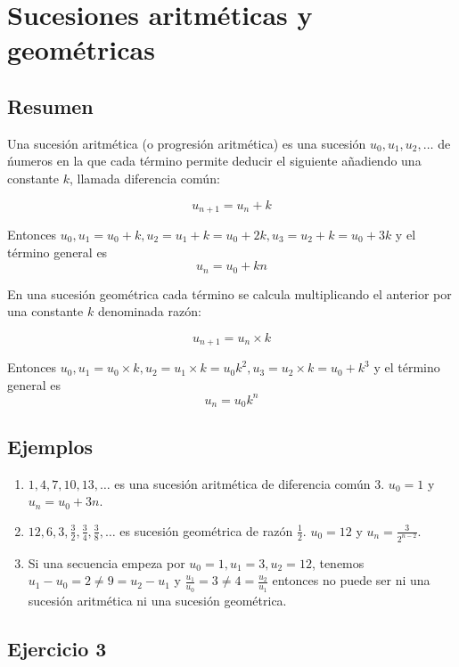 \section{Sucesiones aritméticas y geométricas}

\subsection*{Resumen}

Una sucesión aritmética (o progresión aritmética) es una sucesión
$u_0, u_1, u_2, \ldots$ de ńumeros en la que cada término permite deducir el
siguiente añadiendo una constante $k$, llamada diferencia común:

$$u_{n+1} = u_n + k$$

Entonces $u_0, u_1 = u_0 + k, u_2 = u_1 + k = u_0 + 2k,
u_3 = u_2 + k = u_0 + 3k$ y el término general es
$$u_n = u_0 + {k n}$$

En una sucesión geométrica cada término se calcula multiplicando el anterior
por una constante $k$ denominada razón:

$$u_{n+1} = u_n \times k$$

Entonces $u_0, u_1 = u_0 \times k, u_2 = u_1 \times k = u_0 k^2,
u_3 = u_2 \times k = u_0 + k^3$ y el término general es
$$u_n = u_0 k^n$$

\subsection*{Ejemplos}

\begin{enumerate}
\item $1, 4, 7, 10, 13, \ldots$ es una sucesión aritmética de diferencia común $3$.
  $u_0 = 1$ y $u_n = u_0 + 3n$.
\item $12, 6, 3, \frac{3}{2}, \frac{3}{4}, \frac{3}{8}, \ldots$ es sucesión
  geométrica de razón $\frac{1}{2}$. $u_0 = 12$ y
  $u_n = \frac{3}{2^{n-2}}$.
\item Si una secuencia empeza por
  $u_0 = 1, u_1 = 3, u_2 = 12$, tenemos $u_1 - u_0 = 2 \neq 9 = u_2 - u_1$ y
  $\frac{u_1}{u_0} = 3 \neq 4 = \frac{u_2}{u_1}$ entonces no puede ser ni
  una sucesión aritmética ni una sucesión geométrica.
\end{enumerate}

\subsection*{Ejercicio 3}

